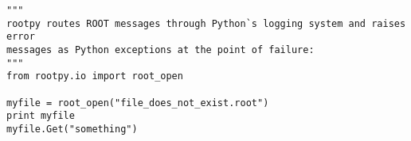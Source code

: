 \begin{footnotesize}
\begin{verbatim}
"""
rootpy routes ROOT messages through Python`s logging system and raises error
messages as Python exceptions at the point of failure:
"""
from rootpy.io import root_open

myfile = root_open("file_does_not_exist.root")
print myfile
myfile.Get("something")
\end{verbatim}
\end{footnotesize}
